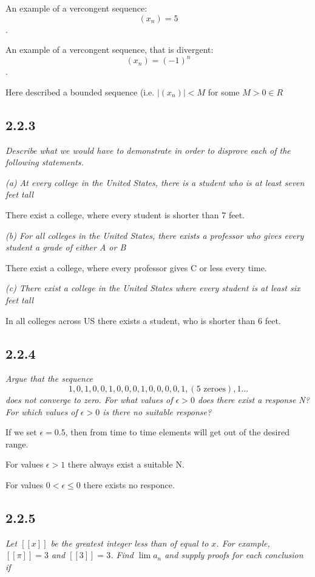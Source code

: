 \documentclass[11pt,oneside,titlepage]{book}
\begin{document}
An example of a vercongent sequence:
$$(x_n) = 5$$.

An example of a vercongent sequence, that is divergent:
$$(x_n) = (-1)^n$$.

Here described a bounded sequence (i.e. $|(x_n)| < M$  for some $M > 0\in R$

\subsection*{2.2.3}
\textit{Describe what we would have to demonstrate in order to disprove each
  of the following statements.}

\textit{(a) At every college in the United States, there is a student who is at least
  seven feet tall}

There exist a college, where every student is shorter than 7 feet.

\textit{(b) For all colleges in the United States, there exists a professor who
  gives every student a grade of either A or B}

There exist a college, where every professor gives C or less every time.

\textit{(c) There exist a college in the United States where every student is at least
  six feet tall}

In all colleges across US there exists a student, who is shorter than 6 feet.

\subsection*{2.2.4}
\textit{Argue that the sequence }
$$1, 0, 1, 0, 0, 1, 0, 0, 0, 1, 0, 0, 0, 0, 1, (\text{5 zeroes}), 1...$$
\textit{
  does not converge to zero. For what values of $\epsilon > 0$ does there exist a response
  N? For which values of $\epsilon > 0$ is there no suitable response?}

If we set $\epsilon = 0.5$, then from time to time elements will get out of
the desired range.

For values $\epsilon > 1$ there always exist a suitable N.

For values $ 0 < \epsilon \leq 0$ there exists no responce.

\subsection*{2.2.5}
\textit{Let $[[x]]$ be the greatest integer less than of equal to $x$. For example,
  $[[\pi]] = 3$ and $[[3]] = 3$. Find $\lim a_n$ and supply proofs for each conclusion
  if}
\end{document}
